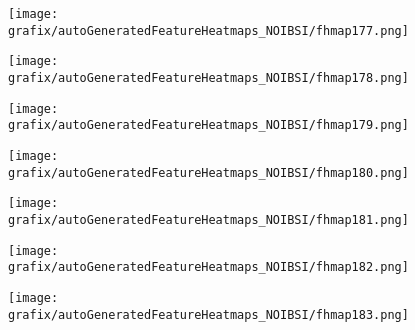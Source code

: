 \begin{subfigure}{\wid\textwidth} 
    \centering 
    \caption{\tiny \sffamily {}} 
    \vspace{\vsp} 
    \texttt{[image: grafix/autoGeneratedFeatureHeatmaps\_NOIBSI/fhmap177.png]} 
\end{subfigure} 
\hspace{\hsp} 
\begin{subfigure}{\wid\textwidth} 
    \centering 
    \caption{\tiny \sffamily {}} 
    \vspace{\vsp} 
    \texttt{[image: grafix/autoGeneratedFeatureHeatmaps\_NOIBSI/fhmap178.png]} 
\end{subfigure} 
\hspace{\hsp} 
\begin{subfigure}{\wid\textwidth} 
    \centering 
    \caption{\tiny \sffamily {}} 
    \vspace{\vsp} 
    \texttt{[image: grafix/autoGeneratedFeatureHeatmaps\_NOIBSI/fhmap179.png]} 
\end{subfigure} 
\hspace{\hsp} 
\begin{subfigure}{\wid\textwidth} 
    \centering 
    \caption{\tiny \sffamily {}} 
    \vspace{\vsp} 
    \texttt{[image: grafix/autoGeneratedFeatureHeatmaps\_NOIBSI/fhmap180.png]} 
\end{subfigure} 
\hspace{\hsp} 
\begin{subfigure}{\wid\textwidth} 
    \centering 
    \caption{\tiny \sffamily {}} 
    \vspace{\vsp} 
    \texttt{[image: grafix/autoGeneratedFeatureHeatmaps\_NOIBSI/fhmap181.png]} 
\end{subfigure} 
\hspace{\hsp} 
\begin{subfigure}{\wid\textwidth} 
    \centering 
    \caption{\tiny \sffamily {}} 
    \vspace{\vsp} 
    \texttt{[image: grafix/autoGeneratedFeatureHeatmaps\_NOIBSI/fhmap182.png]} 
\end{subfigure} 
\hspace{\hsp} 
\begin{subfigure}{\wid\textwidth} 
    \centering 
    \caption{\tiny \sffamily {}} 
    \vspace{\vsp} 
    \texttt{[image: grafix/autoGeneratedFeatureHeatmaps\_NOIBSI/fhmap183.png]} 
\end{subfigure} 
